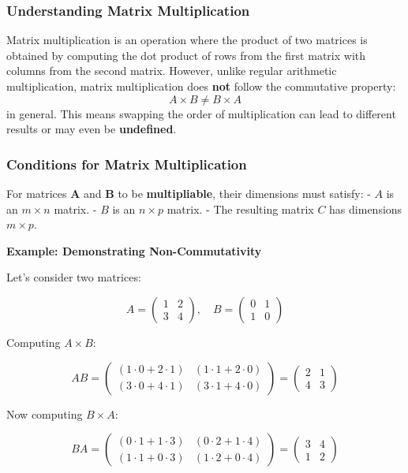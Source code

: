 \documentclass[
  letterpaper,
  DIV=11,
  numbers=noendperiod]{scrartcl}
\begin{document}
\subsubsection{Understanding Matrix
Multiplication}\label{understanding-matrix-multiplication}

Matrix multiplication is an operation where the product of two matrices
is obtained by computing the dot product of rows from the first matrix
with columns from the second matrix. However, unlike regular arithmetic
multiplication, matrix multiplication does \textbf{not} follow the
commutative property: \[
A \times B \neq B \times A
\] in general. This means swapping the order of multiplication can lead
to different results or may even be \textbf{undefined}.

\subsubsection{\texorpdfstring{\textbf{Conditions for Matrix
Multiplication}}{Conditions for Matrix Multiplication}}\label{conditions-for-matrix-multiplication}

For matrices \textbf{A} and \textbf{B} to be \textbf{multipliable},
their dimensions must satisfy: - \(A\) is an \(m \times n\) matrix. -
\(B\) is an \(n \times p\) matrix. - The resulting matrix \(C\) has
dimensions \(m \times p\).

\textbf{Example: Demonstrating Non-Commutativity}

Let's consider two matrices:

\[
A = \begin{pmatrix}
1 & 2 \\
3 & 4
\end{pmatrix}, \quad
B = \begin{pmatrix}
0 & 1 \\
1 & 0
\end{pmatrix}
\]

Computing \(A \times B\):

\[
A B =
\begin{pmatrix}
(1 \cdot 0 + 2 \cdot 1) & (1 \cdot 1 + 2 \cdot 0) \\
(3 \cdot 0 + 4 \cdot 1) & (3 \cdot 1 + 4 \cdot 0)
\end{pmatrix}
=
\begin{pmatrix}
2 & 1 \\
4 & 3
\end{pmatrix}
\]

Now computing \(B \times A\):

\[
B A =
\begin{pmatrix}
(0 \cdot 1 + 1 \cdot 3) & (0 \cdot 2 + 1 \cdot 4) \\
(1 \cdot 1 + 0 \cdot 3) & (1 \cdot 2 + 0 \cdot 4)
\end{pmatrix}
=
\begin{pmatrix}
3 & 4 \\
1 & 2
\end{pmatrix}
\]
\end{document}
